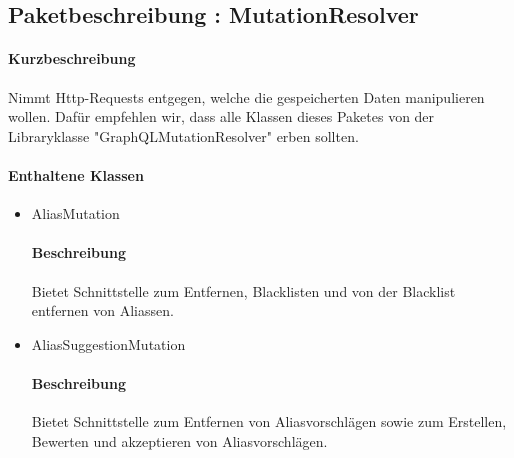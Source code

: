 \subsection{Paketbeschreibung : MutationResolver}%
\paragraph*{Kurzbeschreibung}
Nimmt Http-Requests entgegen, welche die gespeicherten Daten manipulieren wollen.
Dafür empfehlen wir, dass alle Klassen dieses Paketes von der Libraryklasse "GraphQLMutationResolver" erben sollten.
\paragraph*{Enthaltene Klassen}
\begin{itemize}
    \item AliasMutation
    		\paragraph*{Beschreibung}
            Bietet Schnittstelle zum Entfernen, Blacklisten und von der Blacklist entfernen von Aliassen.
    \item AliasSuggestionMutation
    		\paragraph*{Beschreibung}
    		Bietet Schnittstelle zum Entfernen von Aliasvorschlägen sowie zum Erstellen, Bewerten und akzeptieren von Aliasvorschlägen.
\end{itemize}